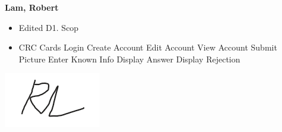 \documentclass[]{article}
\begin{document}
\textbf{Lam, Robert}
\begin{itemize}
		\item Edited D1. Scop
		\item CRC Cards
        \subitem Login
		\subitem Create Account
		\subitem Edit Account
		\subitem View Account
		\subitem Submit Picture
		\subitem Enter Known Info
		\subitem Display Answer 
		\subitem Display Rejection
\end{itemize}
\includegraphics[scale=1]{robertsignature.png}

\end{document}
